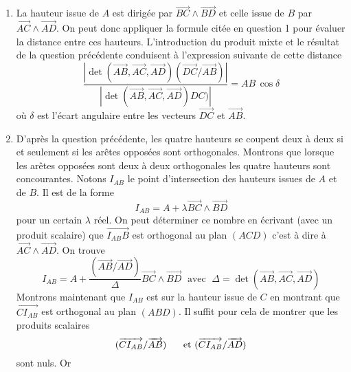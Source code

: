 \begin{enumerate}
 \item La hauteur issue de $A$ est dirigée par $\overrightarrow{BC}\wedge \overrightarrow{BD}$ et celle issue de $B$ par $\overrightarrow{AC}\wedge \overrightarrow{AD}$. On peut donc appliquer la formule citée en question 1 pour évaluer la distance entre ces hauteurs. L'introduction du produit mixte et le résultat de la question précédente conduisent à l'expression suivante de cette distance
\begin{displaymath}
\frac 
{\left|\det(\overrightarrow{AB},\overrightarrow{AC},\overrightarrow{AD})(\overrightarrow{DC}/\overrightarrow{AB})\right|}
{\left|\det(\overrightarrow{AB},\overrightarrow{AC},\overrightarrow{AD})DC)\right|}
= AB \,\cos \delta
\end{displaymath}
où $\delta$ est l'écart angulaire entre les vecteurs $\overrightarrow{DC}$ et $\overrightarrow{AB}$.
 \item D'après la question précédente, les quatre hauteurs se coupent deux à deux si et seulement si les arêtes opposées sont orthogonales.\newline
Montrons que lorsque les arêtes opposées sont deux à deux orthogonales les quatre hauteurs sont concourantes.\newline
Notons $I_{AB}$ le point d'intersection des hauteurs issues de $A$ et de $B$. Il est de la forme
\begin{displaymath}
I_{AB} = A + \lambda \overrightarrow{BC}\wedge\overrightarrow{BD} 
\end{displaymath}
pour un certain $\lambda$ réel. On peut déterminer ce nombre en écrivant (avec un produit scalaire) que $\overrightarrow{I_{AB}B}$ est orthogonal au plan $(ACD)$ c'est à dire à $\overrightarrow{AC}\wedge \overrightarrow{AD}$. On trouve
\begin{displaymath}
 I_{AB} = A + \frac{(\overrightarrow{AB}/\overrightarrow{AD})}{\Delta} \overrightarrow{BC}\wedge\overrightarrow{BD}
\;\text{ avec }\;
\Delta = \det(\overrightarrow{AB},\overrightarrow{AC},\overrightarrow{AD})
\end{displaymath}
Montrons maintenant que $I_{AB}$ est sur la hauteur issue de $C$ en montrant que $\overrightarrow{ CI_{AB}}$ est orthogonal au plan $(ABD)$. Il suffit pour cela de montrer que les produits scalaires
\begin{displaymath}
 (\overrightarrow{ CI_{AB}}/\overrightarrow{AB})\hspace{0.5cm} \text{ et }
(\overrightarrow{ CI_{AB}}/\overrightarrow{AD})
\end{displaymath}
sont nuls. Or

\end{enumerate}
